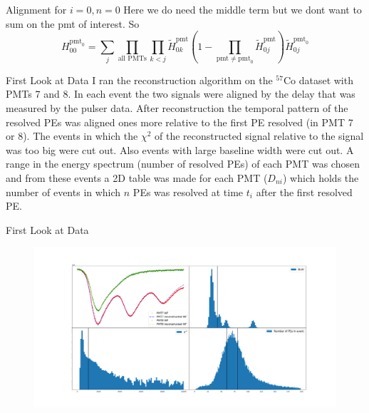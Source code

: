 \documentclass{beamer}
\begin{document}
\begin{frame}{Alignment for $i=0, n=0$}
Here we do need the middle term but we dont want to sum on the pmt of interest. So
\begin{equation}
H_{00}^{\text{pmt}_0}=\sum_j\prod_{\text{all PMTs}}\prod_{k<j}\tilde{H}_{0k}^{\text{pmt}}\left(1-\prod_{\text{pmt}\neq\text{pmt}_0}\tilde{H}_{0j}^{\text{pmt}}\right)\tilde{H}_{0j}^{\text{pmt}_0}
\end{equation}
\end{frame}

\begin{frame}{First Look at Data}
I ran the reconstruction algorithm on the $^{57}$Co dataset with PMTs 7 and 8. In each event the two signals were aligned by the delay that was measured by the pulser data. After reconstruction the temporal pattern of the resolved PEs was aligned ones more relative to the first PE resolved (in PMT 7 or 8). The events in which the $\chi^2$ of the reconstructed signal relative to the signal was too big were cut out. Also events with large baseline width were cut out. A range in the energy spectrum (number of resolved PEs) of each PMT was chosen and from these events a 2D table was made for each PMT ($D_{ni}$) which holds the number of events in which $n$ PEs was resolved at time $t_i$ after the first resolved PE.
\end{frame}

\begin{frame}{First Look at Data}
\begin{figure}[h]
\includegraphics[width=1\textwidth]{data_event.png}
\end{figure}
\end{frame}
\end{document}
